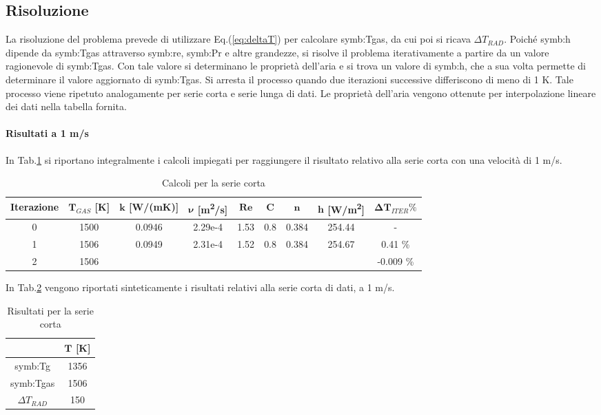 \subsection{Risoluzione}
La risoluzione del problema prevede di utilizzare Eq.(\ref{eq:deltaT}) per calcolare \gls{symb:Tgas}, da cui poi si ricava $\Delta T_{\textit{RAD}}$. Poiché \gls{symb:h} dipende da \gls{symb:Tgas} attraverso \gls{symb:re}, \gls{symb:Pr} e altre grandezze, si risolve il problema iterativamente a partire da un valore ragionevole di \gls{symb:Tgas}. Con tale valore si determinano le proprietà dell'aria e si trova un valore di \gls{symb:h}, che a sua volta permette di determinare il valore aggiornato di \gls{symb:Tgas}. Si arresta il processo quando due iterazioni successive differiscono di meno di 1 K.
Tale processo viene ripetuto analogamente per serie corta e serie lunga di dati. 
Le proprietà dell'aria vengono ottenute per interpolazione lineare dei dati nella tabella fornita. 


\paragraph{Risultati a 1 m/s}
In Tab.\ref{tab:calcolishort1} si riportano integralmente i calcoli impiegati per raggiungere il risultato relativo alla serie corta con una velocità di 1 m/s. 

\begin{table}[H]
	\centering
	\begin{tabular}{c|c|c|c|c|c|c|c|c}
		\toprule
		\toprule
		\textbf{Iterazione} & $\bm{T_{\textit{GAS}}}$ [K]& $\bm{k}$ [W/(mK)] & $\bm{\nu}$ [m\textsuperscript{2}/s] & $\bm{Re}$ & $\bm{C}$ & $\bm{n}$ & $\bm{h}$ [W/m\textsuperscript{2}] & $\bm{\Delta T_{\textit{ITER}} \%}$\\
		\midrule
		\midrule
		0 & 1500 & 0.0946 & 2.29e-4 & 1.53 & 0.8 & 0.384 & 254.44 & - \\
		\midrule
		1 & 1506 & 0.0949 & 2.31e-4 & 1.52 & 0.8 & 0.384 & 254.67 & 0.41 \% \\
		\midrule
		2 & 1506 & & &  &  &  &  &  -0.009 \% \\
		\bottomrule
		\bottomrule	
	\end{tabular}
	\caption{Calcoli per la serie corta}
	\label{tab:calcolishort1}
\end{table}

In Tab.\ref{tab:risultatishort1} vengono riportati sinteticamente i risultati relativi alla serie corta di dati, a 1 m/s.

\begin{table}[H]
	\centering
	\begin{tabular}{c|c}
		\toprule
		\toprule
		& $\bm{T}$ [K]\\
		\midrule
		\midrule
		\gls{symb:Tg} & 1356 \\
		\midrule
		\gls{symb:Tgas} & 1506 \\
		\midrule
		$\Delta T_{\textit{RAD}}$ & 150 \\
		\bottomrule
		\bottomrule	
	\end{tabular}
	\caption{Risultati per la serie corta}
	\label{tab:risultatishort1}
\end{table}



